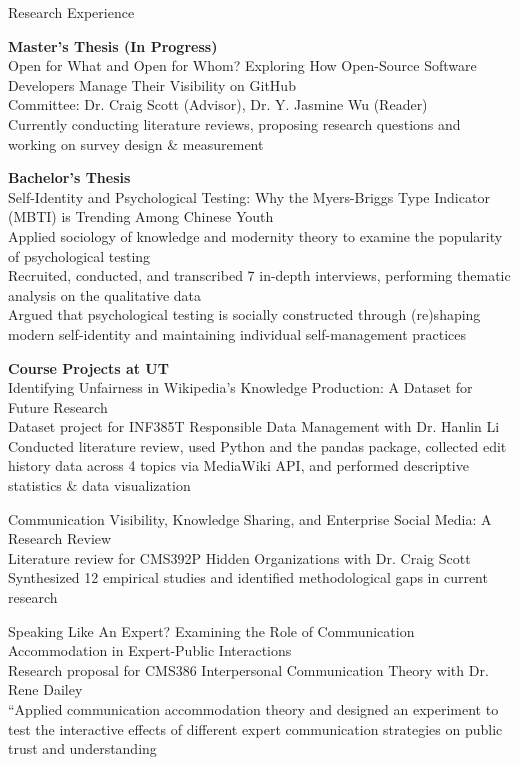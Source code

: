 \documentclass[
	11pt, %
]{resume} %
\begin{document}
\begin{rSection}{Research Experience}

    \textbf{Master's Thesis (In Progress)}\\ 
    Open for What and Open for Whom? Exploring How Open-Source Software Developers Manage Their Visibility on GitHub\\
\textbullet\enspace Committee: Dr. Craig Scott (Advisor), Dr. Y. Jasmine Wu (Reader)\\
\textbullet\enspace Currently conducting literature reviews, proposing research questions and working on survey design \& measurement

    \textbf{Bachelor's Thesis}\\ 
    Self-Identity and Psychological Testing: Why the Myers-Briggs Type Indicator (MBTI) is Trending Among Chinese Youth\\ 
\textbullet\enspace Applied sociology of knowledge and modernity theory to examine the popularity of psychological testing\\
\textbullet\enspace Recruited, conducted, and transcribed 7 in-depth interviews, performing thematic analysis on the qualitative data\\
\textbullet\enspace Argued that psychological testing is socially constructed through (re)shaping modern self-identity and maintaining individual self-management practices


    \textbf{Course Projects at UT}\\ 
    Identifying Unfairness in Wikipedia's Knowledge Production: A Dataset for Future Research\\
\textbullet\enspace Dataset project for INF385T Responsible Data Management with Dr. Hanlin Li\\    
\textbullet\enspace Conducted literature review, used Python and the pandas package, collected edit history data across 4 topics via MediaWiki API, and performed descriptive statistics \& data visualization

   Communication Visibility, Knowledge Sharing, and Enterprise Social Media: A Research Review\\
\textbullet\enspace Literature review for CMS392P Hidden Organizations with Dr. Craig Scott\\    
\textbullet\enspace Synthesized 12 empirical studies and identified methodological gaps in current research

  Speaking Like An Expert? Examining the Role of Communication Accommodation in Expert-Public Interactions\\
\textbullet\enspace Research proposal for CMS386 Interpersonal Communication Theory with Dr. Rene Dailey\\    
\textbullet\enspace “Applied communication accommodation theory and designed an experiment to test the interactive effects of different expert communication strategies on public trust and understanding


\end{rSection}
\end{document}
